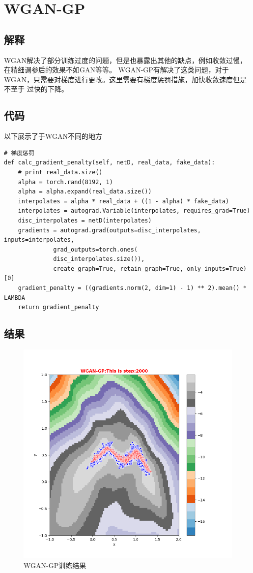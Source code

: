 \documentclass[12pt, a4paper]{report}
\begin{document}
\chapter{WGAN-GP}

\section{解释}

WGAN解决了部分训练过度的问题，但是也暴露出其他的缺点，例如收敛过慢，在精细调参后的效果不如GAN等等。
WGAN-GP有解决了这类问题，对于WGAN，只需要对梯度进行更改。这里需要有梯度惩罚措施，加快收敛速度但是不至于
过快的下降。

\section{代码}

以下展示了于WGAN不同的地方
\small
\begin{verbatim}
# 梯度惩罚
def calc_gradient_penalty(self, netD, real_data, fake_data):
    # print real_data.size()
    alpha = torch.rand(8192, 1)
    alpha = alpha.expand(real_data.size())
    interpolates = alpha * real_data + ((1 - alpha) * fake_data)
    interpolates = autograd.Variable(interpolates, requires_grad=True)
    disc_interpolates = netD(interpolates)
    gradients = autograd.grad(outputs=disc_interpolates, inputs=interpolates,
              grad_outputs=torch.ones(
              disc_interpolates.size()),
              create_graph=True, retain_graph=True, only_inputs=True)[0]
    gradient_penalty = ((gradients.norm(2, dim=1) - 1) ** 2).mean() * LAMBDA
    return gradient_penalty
\end{verbatim}

\normalsize

\section{结果}

\begin{figure}[ht]
  \centering
  \includegraphics[scale=0.6]{figure3.png}
  \caption{WGAN-GP训练结果}
  \label{}
\end{figure}
\end{document}

